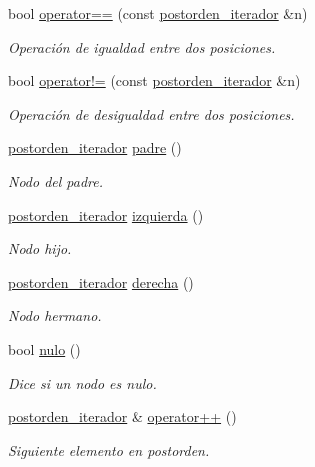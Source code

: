 \begin{DoxyCompactItemize}
\item 
bool \hyperlink{classArbolGeneral_1_1postorden__iterador_a3c823a060b37ab5be8a950b5a79188d3}{operator==} (const \hyperlink{classArbolGeneral_1_1postorden__iterador}{postorden\-\_\-iterador} \&n)
\begin{DoxyCompactList}\small\item\em Operación de igualdad entre dos posiciones. \end{DoxyCompactList}\item 
bool \hyperlink{classArbolGeneral_1_1postorden__iterador_a15ce3ad6eded0487e0b2b5a49abde5ce}{operator!=} (const \hyperlink{classArbolGeneral_1_1postorden__iterador}{postorden\-\_\-iterador} \&n)
\begin{DoxyCompactList}\small\item\em Operación de desigualdad entre dos posiciones. \end{DoxyCompactList}\item 
\hyperlink{classArbolGeneral_1_1postorden__iterador}{postorden\-\_\-iterador} \hyperlink{classArbolGeneral_1_1postorden__iterador_a939b113299035ac4f56c1ebc8c7de763}{padre} ()
\begin{DoxyCompactList}\small\item\em Nodo del padre. \end{DoxyCompactList}\item 
\hyperlink{classArbolGeneral_1_1postorden__iterador}{postorden\-\_\-iterador} \hyperlink{classArbolGeneral_1_1postorden__iterador_a41de2f17fa6fd5f76654770858d4f3b2}{izquierda} ()
\begin{DoxyCompactList}\small\item\em Nodo hijo. \end{DoxyCompactList}\item 
\hyperlink{classArbolGeneral_1_1postorden__iterador}{postorden\-\_\-iterador} \hyperlink{classArbolGeneral_1_1postorden__iterador_ae2b24cd3445cac918c67574c0879b189}{derecha} ()
\begin{DoxyCompactList}\small\item\em Nodo hermano. \end{DoxyCompactList}\item 
bool \hyperlink{classArbolGeneral_1_1postorden__iterador_a68390390c83bf6e26d9ea74d547f1b2c}{nulo} ()
\begin{DoxyCompactList}\small\item\em Dice si un nodo es nulo. \end{DoxyCompactList}\item 
\hyperlink{classArbolGeneral_1_1postorden__iterador}{postorden\-\_\-iterador} \& \hyperlink{classArbolGeneral_1_1postorden__iterador_a3b2f2622714676de99e67aa27a410b68}{operator++} ()
\begin{DoxyCompactList}\small\item\em Siguiente elemento en postorden. \end{DoxyCompactList}\end{DoxyCompactItemize}
